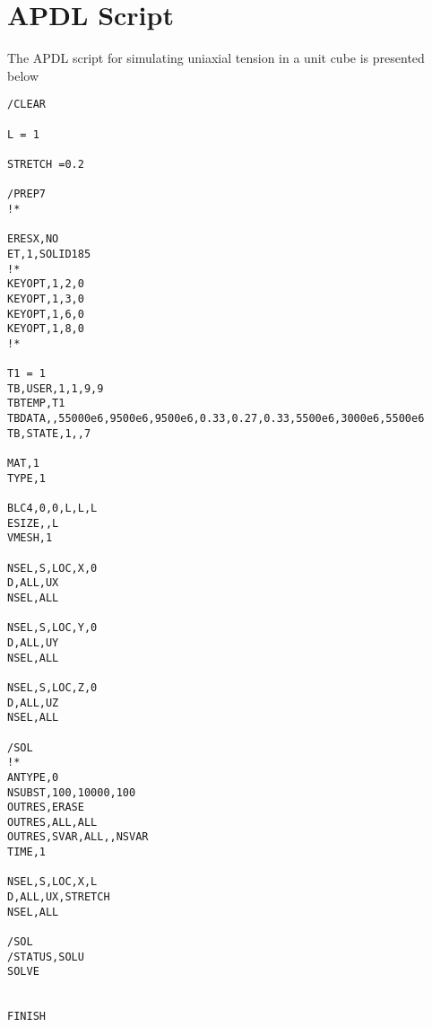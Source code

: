 \section{APDL Script}
\indent\indent\indent   The APDL script for simulating uniaxial tension in a unit cube is presented below
\begin{lstlisting}
/CLEAR

L = 1

STRETCH =0.2

/PREP7
!*  

ERESX,NO
ET,1,SOLID185
!*  
KEYOPT,1,2,0
KEYOPT,1,3,0
KEYOPT,1,6,0
KEYOPT,1,8,0
!*  

T1 = 1
TB,USER,1,1,9,9  
TBTEMP,T1
TBDATA,,55000e6,9500e6,9500e6,0.33,0.27,0.33,5500e6,3000e6,5500e6
TB,STATE,1,,7

MAT,1
TYPE,1

BLC4,0,0,L,L,L
ESIZE,,L
VMESH,1

NSEL,S,LOC,X,0
D,ALL,UX
NSEL,ALL

NSEL,S,LOC,Y,0
D,ALL,UY
NSEL,ALL

NSEL,S,LOC,Z,0
D,ALL,UZ
NSEL,ALL

/SOL
!*  
ANTYPE,0
NSUBST,100,10000,100
OUTRES,ERASE
OUTRES,ALL,ALL  
OUTRES,SVAR,ALL,,NSVAR
TIME,1

NSEL,S,LOC,X,L
D,ALL,UX,STRETCH
NSEL,ALL

/SOL
/STATUS,SOLU
SOLVE   


FINISH


\end{lstlisting}
